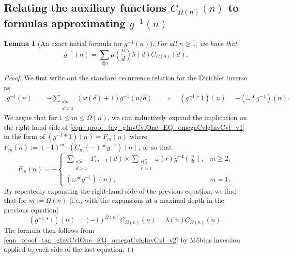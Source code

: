 \documentclass[11pt,reqno,a4letter]{article}
\numberwithin{figure}{section}
\numberwithin{table}{section}
\theoremstyle{plain}
\newtheorem{lemma}[theorem]{Lemma}
\numberwithin{theorem}{section}
\theoremstyle{definition}
\begin{document}
\subsection{Relating the auxiliary functions $C_{\Omega(n)}(n)$ to formulas approximating $g^{-1}(n)$} 
\label{subSection_Relating_CknFuncs_to_gInvn} 

\begin{lemma}[An exact initial formula for $g^{-1}(n)$] 
\label{lemma_AnExactFormulaFor_gInvByMobiusInv_v1} 
For all $n \geq 1$, we have that 
\[
g^{-1}(n) = \sum_{d|n} \mu\left(\frac{n}{d}\right) \lambda(d) C_{\Omega(d)}(d). 
\]
\end{lemma}
\begin{proof} 
We first write out the standard recurrence relation for the Dirichlet inverse as 
\begin{align} 
\label{eqn_proof_tag_gInvCvlOne_EQ_omegaCvlgInvCvl_v1} 
g^{-1}(n) & = - \sum_{\substack{d|n \\ d>1}} (\omega(d) + 1) g^{-1}(n/d) 
     \quad\implies\quad 
     (g^{-1} \ast 1)(n) = -(\omega \ast g^{-1})(n). 
\end{align} 
We argue that for $1 \leq m \leq \Omega(n)$, we can inductively expand the 
implication on the right-hand-side of \eqref{eqn_proof_tag_gInvCvlOne_EQ_omegaCvlgInvCvl_v1} 
in the form of $(g^{-1} \ast 1)(n) = F_m(n)$ where 
$F_m(n) := (-1)^{m} \cdot (C_m(-) \ast g^{-1})(n)$, or so that 
\[
F_m(n) = - 
     \begin{cases} 
     \sum\limits_{\substack{d|n \\ d > 1}} F_{m-1}(d) \times \sum\limits_{\substack{r|\frac{n}{d} \\ r > 1}} 
     \omega(r) g^{-1}\left(\frac{n}{dr}\right), & m \geq 2, \\ 
     (\omega \ast g^{-1})(n), & m = 1. 
     \end{cases} 
\]
By repeatedly expanding the right-hand-side of the previous equation, 
we find that for $m := \Omega(n)$ (i.e., with the expansions at a 
maximal depth in the previous equation) 
\begin{equation} 
\label{eqn_proof_tag_gInvCvlOne_EQ_omegaCvlgInvCvl_v2} 
(g^{-1} \ast 1)(n) = (-1)^{\Omega(n)} C_{\Omega(n)}(n) = \lambda(n) C_{\Omega(n)}(n). 
\end{equation} 
The formula then follows from \eqref{eqn_proof_tag_gInvCvlOne_EQ_omegaCvlgInvCvl_v2} 
by M\"obius inversion applied to each side of the last equation. 
\end{proof} 
\end{document}
